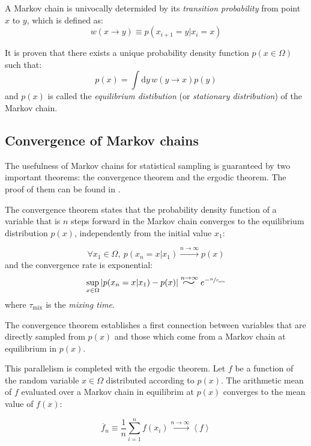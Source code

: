 A Markov chain is univocally determided by its \emph{transition probability} from point $x$ to $y$, which is defined as:
\begin{equation}\label{eq:transition}
    w(x \to y) \equiv p(x_{i+1}=y|x_i=x)
\end{equation}

It is proven \cite{mc-mt} that there exists a unique probability density function $p(x\in\Omega)$
such that:
\begin{equation}\label{eq:equilibrium}
	p(x) = \int\mathrm dy\,w(y \to x)p(y)
\end{equation}
and $p(x)$ is called the \emph{equilibrium distibution} (or \emph{stationary distribution}) of the Markov chain.

\subsection*{Convergence of Markov chains}
The usefulness of Markov chains for statistical sampling is guaranteed by two important theorems:
the convergence theorem and the ergodic theorem. The proof of them can be found in \cite{mc-mt}.

The convergence theorem states that the probability density function of a variable that is $n$ steps forward in the Markov chain
converges to the equilibrium distribution $p(x)$, independently from the initial value $x_1$:
\begin{theorem}\label{th:convergence}
    \[
        \forall x_1 \in \Omega,\ p(x_{n}=x|x_1) \xrightarrow{n\to\infty} p(x)
    \]
    and the convergence rate is exponential:
    \[
        \sup_{x\in\Omega} |p(x_n=x|x_1) - p(x)| \stackrel{n\to\infty}{\scalebox{2}[1.25]{$\sim$}} e^{-\sfrac{n}{\tau_\mathrm{mix}}}
    \]
    where $\tau_\mathrm{mix}$ is the \emph{mixing time}.
\end{theorem}

The convergence theorem establishes a first connection between variables that are directly sampled from $p(x)$
and those which come from a Markov chain at equilibrium in $p(x)$.

This parallelism is completed with the ergodic theorem.
Let $f$ be a function of the random variable $x\in\Omega$ distributed according to $p(x)$.
The arithmetic mean of $f$ evaluated over a Markov chain in equilibrim at $p(x)$ converges to the mean value of $f(x)$:
\begin{theorem}\label{th:ergodic}
    \[
        \overline f_n \equiv \frac{1}{n}\sum_{i=1}^n f(x_i) \xrightarrow{n\to\infty} \left<f\right>
    \]
\end{theorem}

